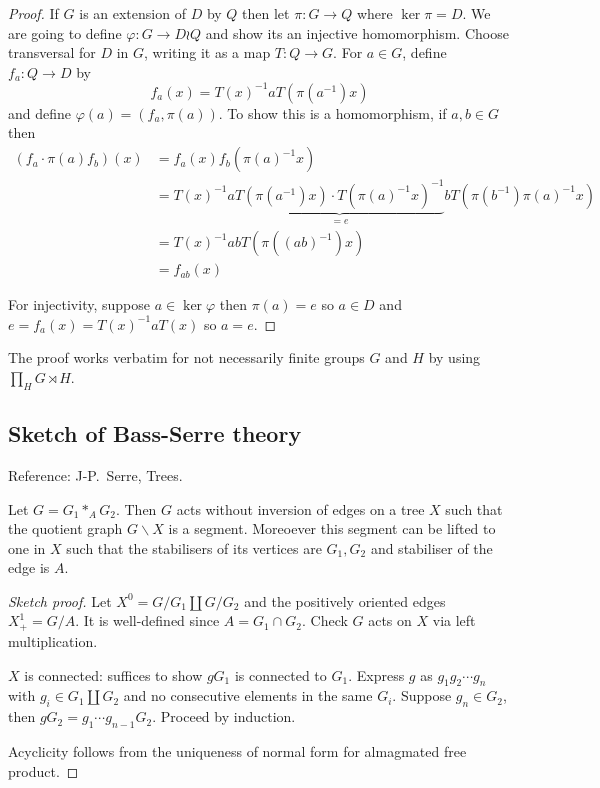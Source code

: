 \documentclass[a4paper]{article}
\begin{document}
\begin{proof}
  If \(G\) is an extension of \(D\) by \(Q\) then let \(\pi: G \to Q\) where \(\ker \pi = D\). We are going to define \(\varphi: G \to D \wr Q\) and show its an injective homomorphism. Choose transversal for \(D\) in \(G\), writing it as a map \(T: Q \to G\). For \(a \in G\), define \(f_a: Q \to D\) by
  \[
    f_a(x) = T(x)^{-1}a T(\pi(a^{-1}) x)
  \]
  and define \(\varphi(a) = (f_a, \pi(a))\). To show this is a homomorphism, if \(a, b \in G\) then
  \begin{align*}
    (f_a \cdot \pi(a)f_b)(x)
    &= f_a(x) f_b(\pi(a)^{-1}x) \\
    &= T(x)^{-1} a \underbrace{T(\pi(a^{-1})x) \cdot T(\pi(a)^{-1}x)^{-1}}_{= e} b T(\pi(b^{-1}) \pi(a)^{-1} x) \\
    &= T(x)^{-1} ab T(\pi((ab)^{-1}) x) \\
    &= f_{ab}(x)
  \end{align*}

  For injectivity, suppose \(a \in \ker \varphi\) then \(\pi(a) = e\) so \(a \in D\) and \(e = f_a(x) = T(x)^{-1}aT(x)\) so \(a = e\).
\end{proof}

\begin{remark}
  The proof works verbatim for not necessarily finite groups \(G\) and \(H\) by using \(\prod_H G \rtimes H\).
\end{remark}

\subsection{Sketch of Bass-Serre theory}

Reference: J-P.\ Serre, Trees.

\begin{theorem}
  Let \(G = G_1 *_A G_2\). Then \(G\) acts without inversion of edges on a tree \(X\) such that the quotient graph \(G \backslash X\) is a segment. Moreoever this segment can be lifted to one in \(X\) such that the stabilisers of its vertices are \(G_1, G_2\) and stabiliser of the edge is \(A\).
\end{theorem}

\begin{proof}[Sketch proof]
  Let \(X^0 = G/G_1 \amalg G/G_2\) and the positively oriented edges \(X_+^1 = G/A\). It is well-defined since \(A = G_1 \cap G_2\). Check \(G\) acts on \(X\) via left multiplication.

  \(X\) is connected: suffices to show \(gG_1\) is connected to \(G_1\). Express \(g\) as \(g_1g_2 \cdots g_n\) with \(g_i \in G_1 \amalg G_2\) and no consecutive elements in the same \(G_i\). Suppose \(g_n \in G_2\), then \(gG_2 = g_1\cdots g_{n - 1}G_2\). Proceed by induction.

  Acyclicity follows from the uniqueness of normal form for almagmated free product.
\end{proof}
\end{document}
